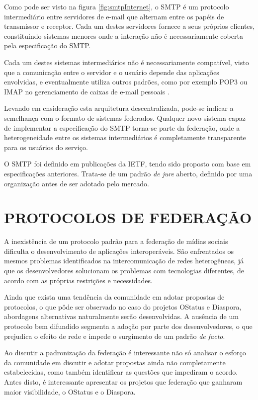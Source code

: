 Como pode ser visto na figura \ref{fig:smtpInternet}, o SMTP é um protocolo
intermediário entre servidores de e-mail que alternam entre os papéis de transmissor
e receptor. Cada um destes servidores fornece a seus próprios clientes, constituindo
sistemas menores onde a interação não é necessariamente coberta pela especificação
do SMTP.

Cada um destes sistemas intermediários não é necessariamente compatível, visto que a
comunicação entre o servidor e o usuário depende das aplicações envolvidas, e
eventualmente utiliza outros padrões, como por exemplo POP3 ou IMAP no gerenciamento
de caixas de e-mail pessoais \cite{tanenbaum2010}.

Levando em cnsideração esta arquitetura descentralizada, pode-se indicar a
semelhança com o formato de sistemas federados. Qualquer novo sistema capaz de
implementar a especificação do SMTP torna-se parte da federação, onde a
heterogeneidade entre os sistemas intermediários é completamente transparente para
os usuários do serviço.

O SMTP foi definido em publicações da IETF, tendo sido proposto com base em
especificações anteriores. Trata-se de um padrão \textit{de jure} aberto, definido
por uma organização antes de ser adotado pelo mercado.



\section{PROTOCOLOS DE FEDERAÇÃO}


A inexistência de um protocolo padrão para a federação de mídias sociais dificulta
o desenvolvimento de aplicações interoperáveis. São enfrentados os mesmos problemas
identificados na intercomunicação de redes heterogêneas, já que os desenvolvedores
solucionam os problemas com tecnologias diferentes, de acordo com as próprias
restrições e necessidades.

Ainda que exista uma tendência da comunidade em adotar propostas de protocolos, o
que pôde ser observado no caso do projetos OStatus e Diaspora, abordagens
alternativas naturalmente serão desenvolvidas. A ausência de um protocolo bem
difundido segmenta a adoção por parte dos desenvolvedores, o que prejudica o efeito
de rede e impede o surgimento de um padrão \textit{de facto}.

Ao discutir a padronização da federação é interessante não só analisar o esforço da
comunidade em discutir e adotar propostas ainda não completamente estabelecidas,
como também identificar as questões que impediram o acordo. Antes disto, é
interessante apresentar os projetos que federação que ganharam maior visibilidade,
o OStatus e o Diaspora.


